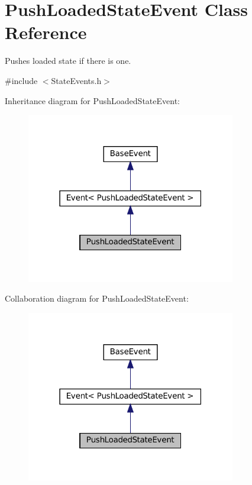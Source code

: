 \hypertarget{classPushLoadedStateEvent}{}\section{Push\+Loaded\+State\+Event Class Reference}
\label{classPushLoadedStateEvent}


Pushes loaded state if there is one.  




{\ttfamily \#include $<$State\+Events.\+h$>$}



Inheritance diagram for Push\+Loaded\+State\+Event\+:\nopagebreak
\begin{figure}[H]
\begin{center}
\leavevmode
\includegraphics[width=259pt]{classPushLoadedStateEvent__inherit__graph}
\end{center}
\end{figure}


Collaboration diagram for Push\+Loaded\+State\+Event\+:\nopagebreak
\begin{figure}[H]
\begin{center}
\leavevmode
\includegraphics[width=259pt]{classPushLoadedStateEvent__coll__graph}
\end{center}
\end{figure}
